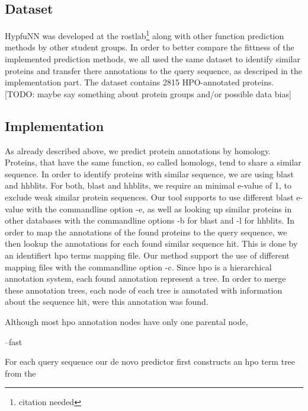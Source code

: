 \subsection{Dataset}

HypfuNN was developed at the rostlab\footnote{citation needed} along with other function prediction methods by other student groups. In order to better compare the fittness of the implemented prediction
methods, we all used the same dataset to identify similar proteins and transfer there annotations to the query sequence, as descriped in the implementation part. The dataset contains 2815 HPO-annotated
proteins. [TODO: maybe say something about protein groups and/or possible data bias]

\subsection{Implementation}

As already described above, we predict protein annotations by homology. Proteins, that have the same function, so called homologs, tend to share a similar sequence. In order to identify proteins
with similar sequence, we are using blast and hhblits. For both, blast and hhblits, we require an minimal e-value of 1, to exclude weak similar protein sequences. Our tool supports to use
different blast e-value with the commandline option -e, as well as looking up similar proteins in other databases with the commandline options -b for blast and -l for hhblits.\newline
In order to map the annotations of the found proteins to the query sequence, we then lookup the annotations for each found similar sequence hit. This is done by an identifiert hpo terms mapping file.
Our method support the use of different mapping files with the commandline option -c.\newline
Since hpo is a hierarchical annotation system, each found annotation represent a tree. In order to merge these annotation trees, each node of each tree is annotated with information about the sequence
hit, were this annotation was found.

Although most hpo annotation nodes have only one parental node, 





--fast 


For each query sequence our de novo predictor first constructs an hpo term tree from the 
